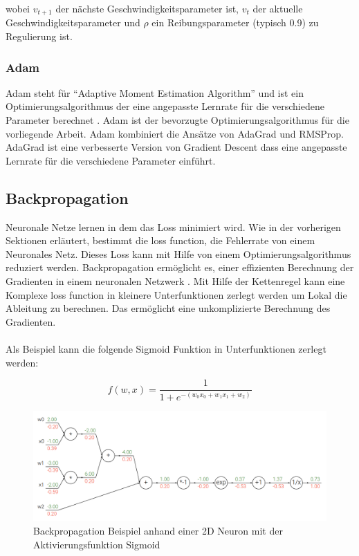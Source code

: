 wobei $v_{t+1}$ der nächste Geschwindigkeitsparameter ist, $v_t$ der aktuelle Geschwindigkeitsparameter und $\rho$ ein Reibungsparameter 
(typisch 0.9) zu Regulierung ist.

\subsubsection{Adam}
Adam steht für ``Adaptive Moment Estimation Algorithm'' und ist ein Optimierungsalgorithmus der eine angepasste Lernrate für die verschiedene 
Parameter berechnet \cite{kingma2014adam}. Adam ist der bevorzugte Optimierungsalgorithmus für die vorliegende Arbeit. 
Adam kombiniert die Ansätze von AdaGrad \cite{duchi2011adaptive} und RMSProp. AdaGrad ist eine 
verbesserte Version von Gradient Descent dass eine angepasste Lernrate für die verschiedene Parameter einführt. 



\subsection{Backpropagation}\label{subsection:backpropagation}
Neuronale Netze lernen in dem das Loss minimiert wird. Wie in der vorherigen Sektionen erläutert, bestimmt die \gls{loss function}, 
die Fehlerrate von einem Neuronales Netz. Dieses Loss kann mit Hilfe von einem Optimierungsalgorithmus reduziert werden. 
Backpropagation ermöglicht es, einer effizienten Berechnung der Gradienten in einem neuronalen Netzwerk \cite{was-ist-backpropagation}. 
Mit Hilfe der Kettenregel kann eine Komplexe \gls{loss function} in kleinere Unterfunktionen zerlegt werden um Lokal die Ableitung zu berechnen.
Das ermöglicht eine unkomplizierte Berechnung des Gradienten.
\\
\\
Als Beispiel kann die folgende Sigmoid Funktion in Unterfunktionen zerlegt werden:

\begin{equation}
  f(w,x) = \frac{1}{1+e^{-(w_0 x_0 + w_1 x_1 + w_2)}}
\end{equation}

\begin{figure}[H]
  \centering
  \includegraphics[width=1\textwidth]{resources/cnn/backpropagation.png}
  \caption{
    Backpropagation Beispiel anhand einer 2D Neuron mit der Aktivierungsfunktion Sigmoid
    \cite{backpropagation}
  }
  \label{image:backpropagation}
\end{figure}

